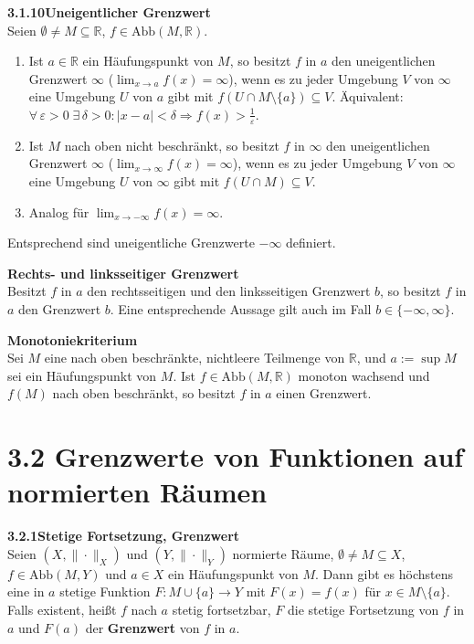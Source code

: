 \documentclass[a4paper,12pt]{article}
\newcommand{\gentry}[3]{%
  \noindent\textbf{#1\quad #2}\nopagebreak\\[0.2em]
  #3\par\smallskip
}
\begin{document}
\gentry{3.1.10}{Uneigentlicher Grenzwert}{%
  Seien $\emptyset \neq M \subseteq \mathbb{R}$, $f \in \mathrm{Abb}(M, \mathbb{R})$.
  \begin{enumerate}[label=(\arabic*),topsep=2pt,itemsep=1pt]
    \item Ist $a \in \mathbb{R}$ ein H\"aufungspunkt von $M$, so besitzt $f$ in $a$
          den uneigentlichen Grenzwert $\infty$ ($\lim_{x \to a} f(x) = \infty$),
          wenn es zu jeder Umgebung $V$ von $\infty$ eine Umgebung $U$ von $a$ gibt mit
          $f(U \cap M \setminus \{a\}) \subseteq V$.
          \"Aquivalent: $\forall\, \varepsilon > 0 \; \exists\, \delta > 0: |x - a| < \delta \Rightarrow f(x) > \tfrac{1}{\varepsilon}$.
    \item Ist $M$ nach oben nicht beschr\"ankt, so besitzt $f$ in $\infty$ den uneigentlichen
          Grenzwert $\infty$ ($\lim_{x \to \infty} f(x) = \infty$), wenn es zu jeder
          Umgebung $V$ von $\infty$ eine Umgebung $U$ von $\infty$ gibt mit $f(U \cap M) \subseteq V$.
    \item Analog f\"ur $\lim_{x \to -\infty} f(x) = \infty$.
  \end{enumerate}
  Entsprechend sind uneigentliche Grenzwerte $-\infty$ definiert.
}

\gentry{}{Rechts- und linksseitiger Grenzwert}{%
  Besitzt $f$ in $a$ den rechtsseitigen und den linksseitigen Grenzwert $b$, so
  besitzt $f$ in $a$ den Grenzwert $b$. Eine entsprechende Aussage gilt auch im
  Fall $b \in \{-\infty, \infty\}$.
}

\gentry{}{Monotoniekriterium}{%
  Sei $M$ eine nach oben beschr\"ankte, nichtleere Teilmenge von $\mathbb{R}$, und
  $a := \sup M$ sei ein H\"aufungspunkt von $M$. Ist $f \in \mathrm{Abb}(M, \mathbb{R})$
  monoton wachsend und $f(M)$ nach oben beschr\"ankt, so besitzt $f$ in $a$ einen
  Grenzwert.
}

\section*{3.2 \quad Grenzwerte von Funktionen auf normierten R\"aumen}

\gentry{3.2.1}{Stetige Fortsetzung, Grenzwert}{%
  Seien $(X, \|\cdot\|_X)$ und $(Y, \|\cdot\|_Y)$ normierte R\"aume,
  $\emptyset \neq M \subseteq X$, $f \in \mathrm{Abb}(M, Y)$ und $a \in X$ ein
  H\"aufungspunkt von $M$. Dann gibt es h\"ochstens eine in $a$ stetige Funktion
  $F : M \cup \{a\} \to Y$ mit $F(x) = f(x)$ f\"ur $x \in M \setminus \{a\}$.
  Falls existent, hei{\ss}t $f$ nach $a$ stetig fortsetzbar, $F$ die stetige
  Fortsetzung von $f$ in $a$ und $F(a)$ der \textbf{Grenzwert} von $f$ in $a$.
}
\end{document}
